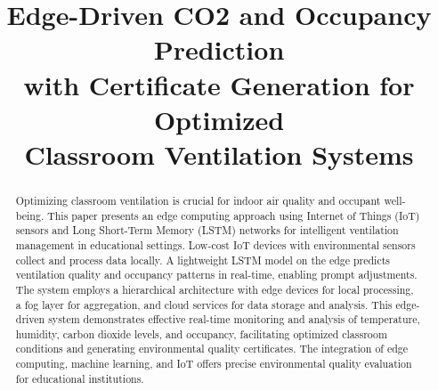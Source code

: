 \documentclass[conference]{IEEEtran}
\begin{document}
\title{Edge-Driven CO2 and Occupancy Prediction \\ with Certificate Generation for Optimized \\ Classroom Ventilation Systems
}

\author{
}

\maketitle

\begin{abstract}
Optimizing classroom ventilation is crucial for indoor air quality and occupant well-being. This paper presents an edge computing approach using Internet of Things (IoT) sensors and Long Short-Term Memory (LSTM) networks for intelligent ventilation management in educational settings. Low-cost IoT devices with environmental sensors collect and process data locally. A lightweight LSTM model on the edge predicts ventilation quality and occupancy patterns in real-time, enabling prompt adjustments. The system employs a hierarchical architecture with edge devices for local processing, a fog layer for aggregation, and cloud services for data storage and analysis. This edge-driven system demonstrates effective real-time monitoring and analysis of temperature, humidity, carbon dioxide levels, and occupancy, facilitating optimized classroom conditions and generating environmental quality certificates. The integration of edge computing, machine learning, and IoT offers precise environmental quality evaluation for educational institutions.
\end{abstract}
\end{document}
